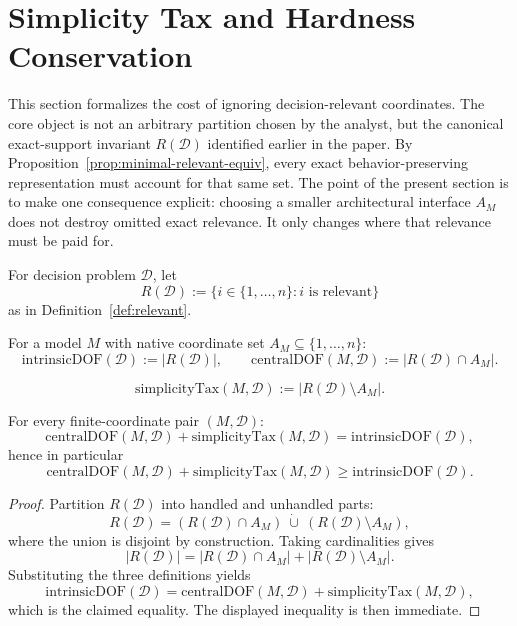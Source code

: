 \section{Simplicity Tax and Hardness Conservation}\label{sec:simplicity-tax}

This section formalizes the cost of ignoring decision-relevant coordinates. The core object is not an arbitrary partition chosen by the analyst, but the canonical exact-support invariant $R(\mathcal{D})$ identified earlier in the paper. By Proposition~\ref{prop:minimal-relevant-equiv}, every exact behavior-preserving representation must account for that same set. The point of the present section is to make one consequence explicit: choosing a smaller architectural interface $A_M$ does not destroy omitted exact relevance. It only changes where that relevance must be paid for.

\begin{definition}
For decision problem $\mathcal{D}$, let
\[
R(\mathcal{D}) := \{i \in \{1,\ldots,n\}: i \text{ is relevant}\}
\]
as in Definition~\ref{def:relevant}.
\end{definition}

\begin{definition}
For a model $M$ with native coordinate set $A_M \subseteq \{1,\ldots,n\}$:
\[
\mathrm{intrinsicDOF}(\mathcal{D}) := |R(\mathcal{D})|,
\qquad
\mathrm{centralDOF}(M,\mathcal{D}) := |R(\mathcal{D}) \cap A_M|.
\]
\end{definition}

\begin{definition}
\[
\mathrm{simplicityTax}(M,\mathcal{D}) := |R(\mathcal{D}) \setminus A_M|.
\]
\end{definition}

\begin{theorem}
For every finite-coordinate pair $(M,\mathcal{D})$:
\[
\mathrm{centralDOF}(M,\mathcal{D}) + \mathrm{simplicityTax}(M,\mathcal{D})
=
\mathrm{intrinsicDOF}(\mathcal{D}),
\]
hence in particular
\[
\mathrm{centralDOF}(M,\mathcal{D}) + \mathrm{simplicityTax}(M,\mathcal{D})
\ge
\mathrm{intrinsicDOF}(\mathcal{D}).
\]
\end{theorem}

\begin{proof}
Partition $R(\mathcal{D})$ into handled and unhandled parts:
\[
R(\mathcal{D}) = (R(\mathcal{D}) \cap A_M)\ \dot\cup\ (R(\mathcal{D}) \setminus A_M),
\]
where the union is disjoint by construction. Taking cardinalities gives
\[
|R(\mathcal{D})|
=
|R(\mathcal{D}) \cap A_M|
+
|R(\mathcal{D}) \setminus A_M|.
\]
Substituting the three definitions yields
\[
\mathrm{intrinsicDOF}(\mathcal{D})
=
\mathrm{centralDOF}(M,\mathcal{D})
+
\mathrm{simplicityTax}(M,\mathcal{D}),
\]
which is the claimed equality. The displayed inequality is then immediate.
\end{proof}

